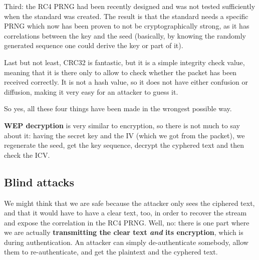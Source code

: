 \vspace{0.5em}

Third: the RC4 PRNG had been recently designed and was not tested sufficiently when the standard was created. The result is that the standard needs a specific PRNG which now has been proven to not be cryptographically strong, as it has correlations between the key and the seed (basically, by knowing the randomly generated sequence one could derive the key or part of it).

Last but not least, CRC32 is fantastic, but it is a simple integrity check value, meaning that it is there only to allow to check whether the packet has been received correctly. It is not a hash value, so it does not have either confusion or diffusion, making it very easy for an attacker to guess it.

So yes, all these four things have been made in the wrongest possible way.

\textbf{WEP decryption} is very similar to encryption, so there is not much to say about it: having the secret key and the IV (which we got from the packet), we regenerate the seed, get the key sequence, decrypt the cyphered text and then check the ICV.


\subsection{Blind attacks}
We might think that we are safe because the attacker only sees the ciphered text, and that it would have to have a clear text, too, in order to recover the stream and expose the correlation in the RC4 PRNG. Well, no: there is one part where we are actually \textbf{transmitting the clear text \textit{and} its encryption}, which is during authentication. An attacker can simply de-authenticate somebody, allow them to re-authenticate, and get the plaintext and the cyphered text.

